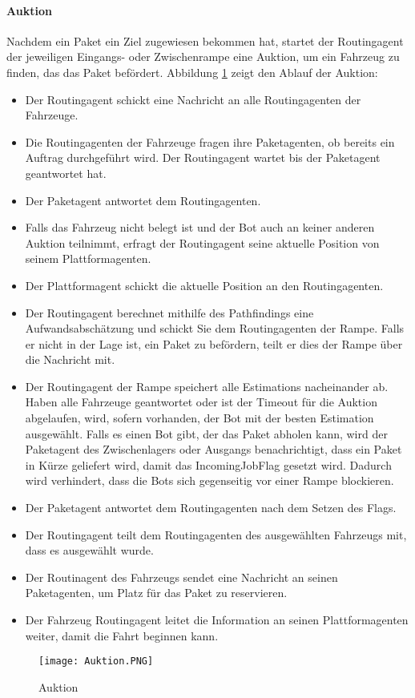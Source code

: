 \paragraph{Auktion}
Nachdem ein Paket ein Ziel zugewiesen bekommen hat, startet der Routingagent der jeweiligen Eingangs- oder Zwischenrampe eine Auktion, um ein Fahrzeug zu finden, das das Paket befördert. Abbildung \ref{Auktion} zeigt den Ablauf der Auktion:
\begin{itemize}
\item Der Routingagent schickt eine Nachricht an alle Routingagenten der Fahrzeuge.
\item Die Routingagenten der Fahrzeuge fragen ihre Paketagenten, ob bereits ein Auftrag durchgeführt wird. Der Routingagent wartet bis der Paketagent geantwortet hat.
\item Der Paketagent antwortet dem Routingagenten.
\item Falls das Fahrzeug nicht belegt ist und der Bot auch an keiner anderen Auktion teilnimmt, erfragt der Routingagent seine aktuelle Position von seinem Plattformagenten.
\item Der Plattformagent schickt die aktuelle Position an den Routingagenten.
\item Der Routingagent berechnet mithilfe des Pathfindings eine Aufwandsabschätzung und schickt Sie dem Routingagenten der Rampe. Falls er nicht in der Lage ist, ein Paket zu befördern, teilt er dies der Rampe über die Nachricht mit.
\item Der Routingagent der Rampe speichert alle Estimations nacheinander ab. Haben alle Fahrzeuge geantwortet oder ist der Timeout für die Auktion abgelaufen, wird, sofern vorhanden, der Bot mit der besten Estimation ausgewählt. Falls es einen Bot gibt, der das Paket abholen kann, wird der Paketagent des Zwischenlagers oder Ausgangs benachrichtigt, dass ein Paket in Kürze geliefert wird, damit das IncomingJobFlag gesetzt wird. Dadurch wird verhindert, dass die Bots sich gegenseitig vor einer Rampe blockieren.
\item Der Paketagent antwortet dem Routingagenten nach dem Setzen des Flags.
\item Der Routingagent teilt dem Routingagenten des ausgewählten Fahrzeugs mit, dass es ausgewählt wurde.
\item Der Routinagent des Fahrzeugs sendet eine Nachricht an seinen Paketagenten, um Platz für das Paket zu reservieren.
\item Der Fahrzeug Routingagent leitet die Information an seinen Plattformagenten weiter, damit die Fahrt beginnen kann.
\end{itemize}
\begin{figure}[h!]
	\centering
		\texttt{[image: Auktion.PNG]}        
		\caption{Auktion}
	\label{Auktion}
\end{figure}
